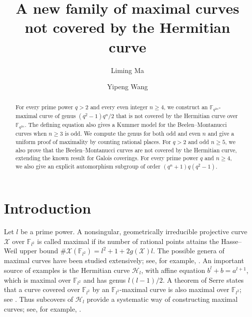 \documentclass[12pt,reqno]{amsart}
\numberwithin{equation}{section}
\newcommand{\F}{\mathbb F}
\theoremstyle{plain}
\theoremstyle{definition}
\theoremstyle{remark}
\begin{document}
\title[Maximal curves not covered by the Hermitian curve]
{A new family of maximal curves not covered by the Hermitian curve}
\date{}
\author[Liming Ma]{Liming Ma}
\address{School of Mathematical Sciences, University of Science and Technology of China,
Hefei, Anhui 230026, China}
\author[Yipeng Wang]{Yipeng Wang}
\address{School of Mathematical Sciences, University of Science and Technology of China,
Hefei, Anhui 230026, China}
\begin{abstract}
For every prime power $q>2$ and every even integer $n\ge4$, we
construct an $\F_{q^{2n}}$-maximal curve of genus
$(q^2-1)q^n/2$ that is not covered by the Hermitian curve over
$\F_{q^{2n}}$. The defining equation also gives a Kummer model
for the Beelen--Montanucci curves when $n\ge3$ is odd.
We compute the genus for both odd and even $n$ and give a uniform
proof of maximality by counting rational places.
For $q>2$ and odd $n\ge5$,
we also prove that the Beelen--Montanucci curves are not covered by
the Hermitian curve, extending the known result for Galois coverings.
For every prime power $q$ and $n\ge4$, we also give an explicit
automorphism subgroup of order $(q^n+1)q(q^2-1)$.
\end{abstract}
\maketitle

\section{Introduction}
\label{b1:introduction}

Let \(l\) be a prime power. A nonsingular, geometrically irreducible
projective curve \(\mathcal X\) over \(\F_{l^2}\) is called maximal
if its number of rational points attains the Hasse--Weil upper bound
\(\#\mathcal X(\F_{l^2})=l^2+1+2g(\mathcal X)l\).
The possible genera of maximal curves have been studied extensively;
see, for example, \cite{FGT1997,XS1995}.
An important source of examples is the Hermitian curve
\(\mathcal H_l\), with affine equation \(b^l+b=a^{l+1}\), which is
maximal over \(\F_{l^2}\) and has genus \(l(l-1)/2\).
A theorem of Serre states that a curve covered over \(\F_{l^2}\)
by an \(\F_{l^2}\)-maximal curve is also maximal over \(\F_{l^2}\);
see \cite[p.~230]{GK2009}.
Thus subcovers of \(\mathcal H_l\) provide a systematic way of
constructing maximal curves; see, for example, \cite{GSX2000}.
\end{document}
